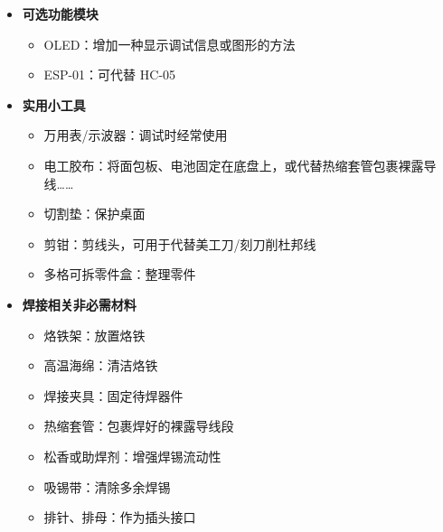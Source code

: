 \documentclass[11pt,a4paper]{article}
\begin{document}
\begin{itemize}
  \item \textbf{可选功能模块}
        \begin{itemize}
          \item OLED：增加一种显示调试信息或图形的方法
          \item ESP-01：可代替 HC-05
        \end{itemize}
  \item \textbf{实用小工具}
        \begin{itemize}
          \item 万用表/示波器：调试时经常使用
          \item 电工胶布：将面包板、电池固定在底盘上，或代替热缩套管包裹裸露导线……
          \item 切割垫：保护桌面
          \item 剪钳：剪线头，可用于代替美工刀/刻刀削杜邦线
          \item 多格可拆零件盒：整理零件
        \end{itemize}
  \item \textbf{焊接相关非必需材料}
        \begin{itemize}
          \item 烙铁架：放置烙铁
          \item 高温海绵：清洁烙铁
          \item 焊接夹具：固定待焊器件
          \item 热缩套管：包裹焊好的裸露导线段
          \item 松香或助焊剂：增强焊锡流动性
          \item 吸锡带：清除多余焊锡
          \item 排针、排母：作为插头接口
        \end{itemize}
\end{itemize}

\end{document}

